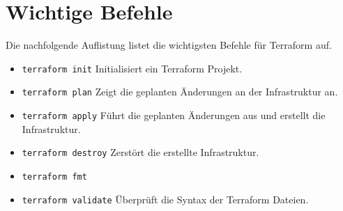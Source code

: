 \documentclass{article}
\begin{document}
    \section{Wichtige Befehle}
    Die nachfolgende Auflistung listet die wichtigsten Befehle für Terraform auf.
    \begin{itemize}
        \item \texttt{terraform init} Initialisiert ein Terraform Projekt.
        \item \texttt{terraform plan} Zeigt die geplanten Änderungen an der Infrastruktur an.
        \item \texttt{terraform apply} Führt die geplanten Änderungen aus und erstellt die Infrastruktur.
        \item \texttt{terraform destroy} Zerstört die erstellte Infrastruktur.
        \item \texttt{terraform fmt} 
        \item \texttt{terraform validate} Überprüft die Syntax der Terraform Dateien.
    \end{itemize}
\end{document}
